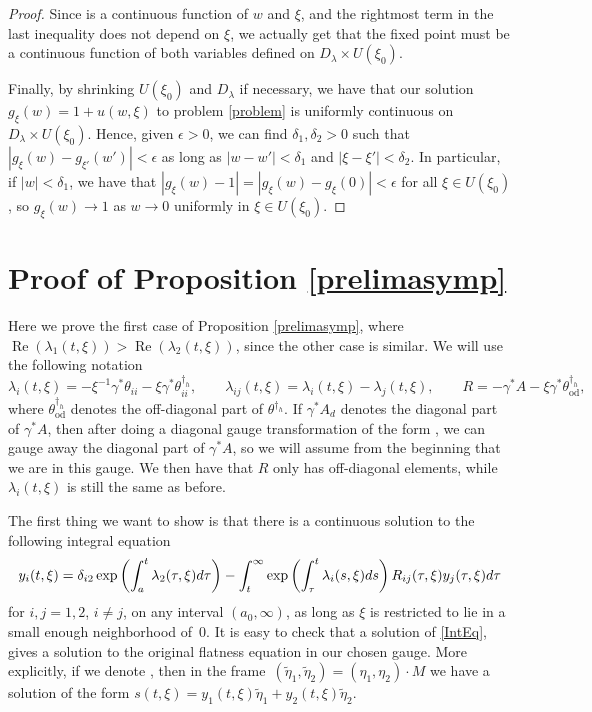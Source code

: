 \documentclass[11pt]{article}
\numberwithin{equation}{section}
\numberwithin{equation}{section}
\begin{document}
\begin{proof}
Since  is a continuous function of $w$ and $\xi$, and the rightmost term in the last inequality does not depend on $\xi$, we actually get that the fixed point must be a continuous function of both variables defined on $D_{\lambda}\times U(\xi_0)$.

Finally, by shrinking $U(\xi_0)$ and $D_{\lambda}$ if necessary, we have that our solution $g_{\xi}(w)=1+u(w,\xi)$ to problem \eqref{problem} is uniformly continuous on $D_{\lambda}\times U(\xi_0)$. Hence, given $\epsilon>0$, we can find $\delta_1,\delta_2>0$ such that $|g_{\xi}(w)-g_{\xi'}(w')|<\epsilon$ as long as $|w-w'|<\delta_1$ and $|\xi-\xi'|<\delta_2$. In particular, if $|w|<\delta_1$, we have that
$
 |g_{\xi}(w)-1|=|g_{\xi}(w)-g_{\xi}(0)|<\epsilon $ for all $\xi \in U(\xi_0)$,
so $g_{\xi}(w)\to 1$ as $w\to 0$ uniformly in $\xi \in U(\xi_0)$.
\end{proof}

\section{Proof of Proposition \ref{prelimasymp}}\label{AD}

Here we prove the first case of Proposition \ref{prelimasymp}, where $\operatorname{Re}(\lambda_1(t,\xi))>\operatorname{Re}(\lambda_2(t,\xi))$, since the other case is similar. We will use the following notation
\begin{equation*}
 \lambda_i(t,\xi)= -\xi^{-1}\gamma^*\theta_{ii} - \xi \gamma^* \theta^{\dagger_h}_{ii},\qquad
 \lambda_{ij}(t,\xi)=\lambda_i(t,\xi)-\lambda_j(t,\xi),\qquad
 R= -\gamma^*A -\xi \gamma^* \theta^{\dagger_h}_{\text{od}},
\end{equation*}
where $\theta^{\dagger_h}_{\text{od}}$ denotes the off-diagonal part of $\theta^{\dagger_h}$. If $\gamma^*A_d$ denotes the diagonal part of $\gamma^*A$, then after doing a diagonal gauge transformation of the form , we can gauge away the diagonal part of $\gamma^*A$, so we will assume from the beginning that we are in this gauge. We then have that $R$ only has off-diagonal elements, while $\lambda_i(t,\xi)$ is still the same as before.

The first thing we want to show is that there is a continuous solution to the following integral equation
\begin{gather}
 y_i(t,\xi) = \delta_{i2}\exp \left(\int_{a}^{t}\lambda_2(\tau,\xi){\rm d}\tau \right)- \int_{t}^{\infty}\exp \left(\int_{\tau}^{t}\lambda_i(s,\xi){\rm d}s\right)R_{ij}(\tau,\xi)y_j(\tau,\xi){\rm d}\tau\label{IntEq}
\end{gather}
for $i,j=1,2$, $i\neq j$, on any interval $(a_0,\infty)$, as long as $\xi$ is restricted to lie in a small enough neighborhood of~$0$. It is easy to check that a solution of \eqref{IntEq}, gives a solution to the original flatness equation in our chosen gauge. More explicitly, if we denote , then in the frame~$(\widetilde{\eta}_1,\widetilde{\eta}_2)=(\eta_1,\eta_2)\cdot M$ we have a solution of the form $s(t,\xi)=y_1(t,\xi)\widetilde{\eta}_1+y_2(t,\xi)\widetilde{\eta}_2$.
\end{document}
